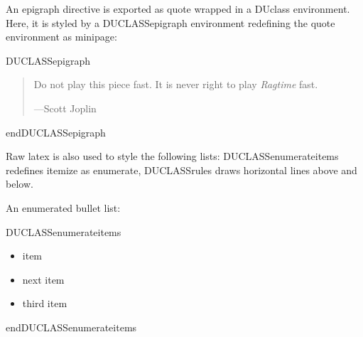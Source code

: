 \documentclass[a4paper]{memoir}
\newenvironment{DUclass}[1]%
    {%
     \def\DocutilsClassFunctionName{DUCLASS#1}
     \csname \DocutilsClassFunctionName \endcsname}%
    {\csname end\DocutilsClassFunctionName \endcsname}%
\begin{document}
An \textquotedbl{}epigraph\textquotedbl{} directive is exported as \textquotedbl{}quote\textquotedbl{} wrapped in a \textquotedbl{}DUclass\textquotedbl{}
environment. Here, it is styled by a \textquotedbl{}DUCLASSepigraph\textquotedbl{} environment
redefining the \textquotedbl{}quote\textquotedbl{} environment as \textquotedbl{}minipage\textquotedbl{}:

\newcommand*{\DUCLASSepigraph}{%
  \renewenvironment{quote}{\vspace{1em}
                           \footnotesize\hfill{}%
                           \begin{minipage}{0.4\columnwidth}}%
                          {\end{minipage}\vskip\baselineskip}}

\begin{DUclass}{epigraph}
\begin{quote}
Do not play this piece fast. It is never right to play \emph{Ragtime} fast.
\nopagebreak

\raggedleft —Scott Joplin
\end{quote}
\end{DUclass}

Raw latex is also used to style the following lists: \textquotedbl{}DUCLASSenumerateitems\textquotedbl{}
redefines \textquotedbl{}itemize\textquotedbl{} as \textquotedbl{}enumerate\textquotedbl{}, \textquotedbl{}DUCLASSrules\textquotedbl{} draws horizontal lines
above and below.

\newcommand*{\DUCLASSenumerateitems}{%
  \renewenvironment{itemize}{\begin{enumerate}}%
                            {\end{enumerate}}%
}

\newenvironment{DUCLASSrules}%
               {\noindent\rule[0.5ex]{1\columnwidth}{1pt}}%
               {\noindent\rule[0.5ex]{1\columnwidth}{1pt}}

An \textquotedbl{}enumerated\textquotedbl{} bullet list:

\begin{DUclass}{enumerateitems}
\begin{itemize}
\item item

\item next item

\item third item
\end{itemize}
\end{DUclass}
\end{document}
